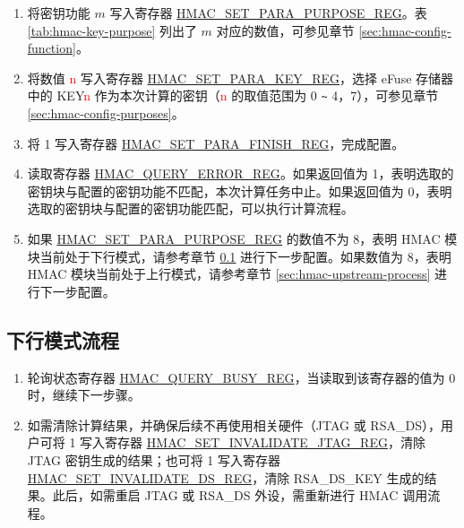 \documentclass[main\_\_CN.tex]{subfiles}
\begin{document}
        \begin{enumerate}
            \item 将密钥功能 \begin{math}m\end{math} 写入寄存器 \hyperref[regdesc:HMACSETPARAPURPOSEREG]{HMAC\_SET\_PARA\_PURPOSE\_REG}。表 \ref{tab:hmac-key-purpose} 列出了 \begin{math}m\end{math} 对应的数值，可参见章节 \ref{sec:hmac-config-function}。
            \item 将数值 \textcolor{red}{n} 写入寄存器 \hyperref[regdesc:HMACSETPARAKEYREG]{HMAC\_SET\_PARA\_KEY\_REG}，选择 eFuse 存储器中的 KEY\textcolor{red}{n} 作为本次计算的密钥（\textcolor{red}{n} 的取值范围为 0 \verb+~+ 4，7），可参见章节 \ref{sec:hmac-config-purposes}。
            \item 将 1 写入寄存器 \hyperref[regdesc:HMACSETPARAFINISHREG]{HMAC\_SET\_PARA\_FINISH\_REG}，完成配置。
            \item 读取寄存器 \hyperref[regdesc:HMACQUERYERRORREG]{HMAC\_QUERY\_ERROR\_REG}。如果返回值为 1，表明选取的密钥块与配置的密钥功能不匹配，本次计算任务中止。如果返回值为 0，表明选取的密钥块与配置的密钥功能匹配，可以执行计算流程。
            \item 如果 \hyperref[regdesc:HMACSETPARAPURPOSEREG]{HMAC\_SET\_PARA\_PURPOSE\_REG} 的数值不为 8，表明 HMAC 模块当前处于下行模式，请参考章节 \ref{sec:hmac-downstream-process} 进行下一步配置。如果数值为 8，表明 HMAC 模块当前处于上行模式，请参考章节 \ref{sec:hmac-upstream-process} 进行下一步配置。
        \end{enumerate}

\subsection{下行模式流程}
\label{sec:hmac-downstream-process}

        \begin{enumerate}
            \item 轮询状态寄存器 \hyperref[regdesc:HMACQUERYBUSYREG]{HMAC\_QUERY\_BUSY\_REG}，当读取到该寄存器的值为 0 时，继续下一步骤。
            \item 如需清除计算结果，并确保后续不再使用相关硬件（JTAG 或 RSA\_DS），用户可将 1 写入寄存器 \hyperref[regdesc:HMACSETINVALIDATEJTAGREG]{HMAC\_SET\_INVALIDATE\_JTAG\_REG}，清除 JTAG 密钥生成的结果；也可将 1 写入寄存器 \hyperref[regdesc:HMACSETINVALIDATEDSREG]{HMAC\_SET\_INVALIDATE\_DS\_REG}，清除 RSA\_DS\_KEY 生成的结果。此后，如需重启 JTAG 或 RSA\_DS 外设，需重新进行 HMAC 调用流程。
        \end{enumerate}
\end{document}
